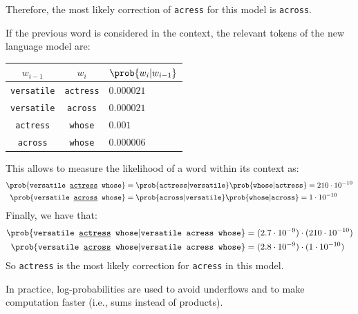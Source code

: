 \begin{example}
    Therefore, the most likely correction of \texttt{acress} for this model is \texttt{across}.

    If the previous word is considered in the context, the relevant tokens of the new language model are:
    \begin{table}[H]
        \centering
        \footnotesize
        \begin{tabular}{ccl}
            \toprule
            $w_{i-1}$ & $w_i$ & $\prob{w_i | w_{i-1}}$ \\
            \midrule
            \texttt{versatile} & \texttt{actress}   & $0.000021$ \\
            \texttt{versatile} & \texttt{across}    & $0.000021$ \\
            \texttt{actress}   & \texttt{whose}     & $0.001$ \\
            \texttt{across}    & \texttt{whose}     & $0.000006$ \\
            \bottomrule
        \end{tabular}
    \end{table}
    This allows to measure the likelihood of a word within its context as:
    \[
        \begin{split}
            \prob{\texttt{versatile \underline{actress} whose}} &= \prob{\texttt{actress} | \texttt{versatile}} \prob{\texttt{whose} | \texttt{actress}} = 210 \cdot 10^{-10} \\
            \prob{\texttt{versatile \underline{across} whose}} &= \prob{\texttt{across} | \texttt{versatile}} \prob{\texttt{whose} | \texttt{across}} = 1 \cdot 10^{-10}
        \end{split}
    \]
    Finally, we have that:
    \[
        \begin{split}
            \prob{\texttt{versatile \underline{actress} whose} | \texttt{versatile acress whose}} &= (2.7 \cdot 10^{-9}) \cdot (210 \cdot 10^{-10}) \\
            \prob{\texttt{versatile \underline{across} whose} | \texttt{versatile acress whose}} &= (2.8 \cdot 10^{-9}) \cdot (1 \cdot 10^{-10}) \\
        \end{split}
    \]
    So \texttt{actress} is the most likely correction for \texttt{acress} in this model.
\end{example}


\begin{remark}
    In practice, log-probabilities are used to avoid underflows and to make computation faster (i.e., sums instead of products).
\end{remark}



